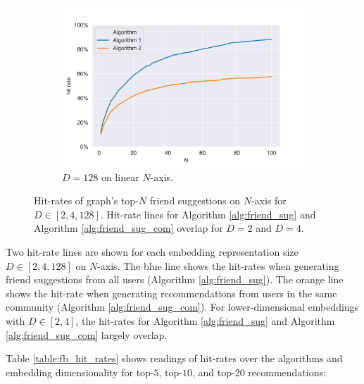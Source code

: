 \documentclass[conference]{IEEEtran}
\begin{document}
\begin{figure}[htbp]
    \begin{subfigure}{.48\textwidth}
        \centering
        \includegraphics[width=1\linewidth]{images/fb/hit_rates_d-128.png}
        \caption{$D=128$ on linear $N$-axis.}
        \label{fig:fb_hit_rates_d128}
    \end{subfigure}%

    \caption{Hit-rates of \citet{social_circles_fb} graph's top-$N$ friend suggestions on $N$-axis for $D \in [2,4,128]$. Hit-rate lines for Algorithm \ref{alg:friend_sug} and Algorithm \ref{alg:friend_sug_com} overlap for $D=2$ and $D=4$.}
    \label{fig:fb_hit_rates}
\end{figure}

Two hit-rate lines are shown for each embedding representation size $D \in [2,4,128]$ on $N$-axis. The blue line shows the hit-rates when generating friend suggestions from all users (Algorithm \ref{alg:friend_sug}). The orange line shows the hit-rate when generating recommendations from users in the same community (Algorithm \ref{alg:friend_sug_com}). For lower-dimensional embeddings with $D \in [2,4]$, the hit-rates for Algorithm \ref{alg:friend_sug} and Algorithm \ref{alg:friend_sug_com} largely overlap.

Table \ref{table:fb_hit_rates} shows readings of hit-rates over the algorithms and embedding dimensionality for top-$5$, top-$10$, and top-$20$ recommendations:
\end{document}
